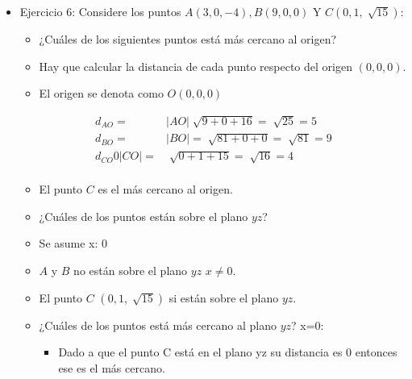 \begin{itemize}
    \item Ejercicio 6: Considere los puntos $A(3,0,-4),B(9,0,0)$ Y $C(0,1,\sqrt[]{15})$:    
        \begin{itemize}
            \item ¿Cuáles de los siguientes puntos está más cercano al origen?
            \item Hay que calcular la distancia de cada punto respecto del origen $(0,0,0)$.
            \item El origen se denota como $O(0,0,0)$
        \end{itemize}
        \begin{center}
           \begin{align*}
               d_{AO} =& \left| AO \right| \sqrt[]{9+0+16}=\sqrt[]{25}=5 \\ 
               d_{BO} =& \left| BO \right|= \sqrt[]{81+0+0} = \sqrt[]{81} = 9 \\ 
                d_{CO} 0 \left| CO \right| =& \sqrt[]{0+1+15} = \sqrt[]{16}=4 \\ 
           \end{align*}
        \end{center}
        \begin{itemize}
            \item El punto $C$ es el más cercano al origen.
        \end{itemize}
        \begin{itemize}
            \item ¿Cuáles de los puntos están sobre el plano $yz$? 
            \item Se asume x: 0
            \item $A$ y $B$ no están sobre el plano $yz$ $x\neq 0$.
            \item El punto $C$ $(0,1,\sqrt[]{15})$ si están sobre el plano $yz$.
            \item ¿Cuáles de los puntos está más cercano al plano $yz$? x=0:
                \begin{itemize}
                    \item Dado a que el punto C está en el plano yz su distancia es 0 entonces ese es el más cercano.
                \end{itemize}
        \end{itemize}
\end{itemize}





